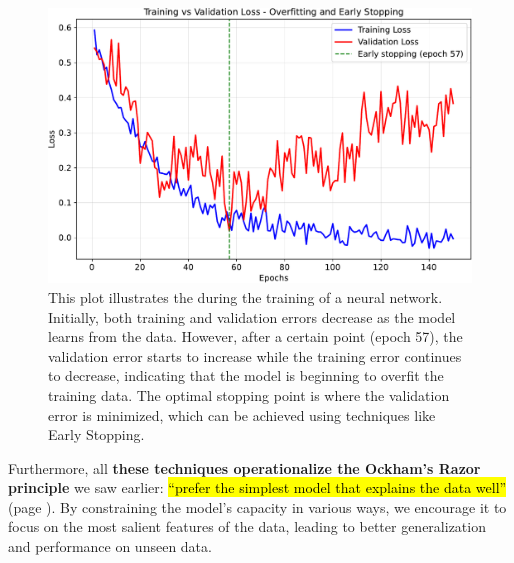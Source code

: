 \begin{figure}[!htp]
    \centering
    \includegraphics[width=\textwidth]{img/neural-networks-and-overfitting/training-vs-validation-loss.pdf}
    \caption{This plot illustrates the  during the training of a neural network. Initially, both training and validation errors decrease as the model learns from the data. However, after a certain point (epoch 57), the validation error starts to increase while the training error continues to decrease, indicating that the model is beginning to overfit the training data. The optimal stopping point is where the validation error is minimized, which can be achieved using techniques like Early Stopping.}
    \label{fig:training-validation-error-curve}
\end{figure}

\noindent
Furthermore, all \textbf{these techniques operationalize the Ockham's Razor principle} we saw earlier: \hl{``prefer the simplest model that explains the data well''} (page ). By constraining the model's capacity in various ways, we encourage it to focus on the most salient features of the data, leading to better generalization and performance on unseen data.